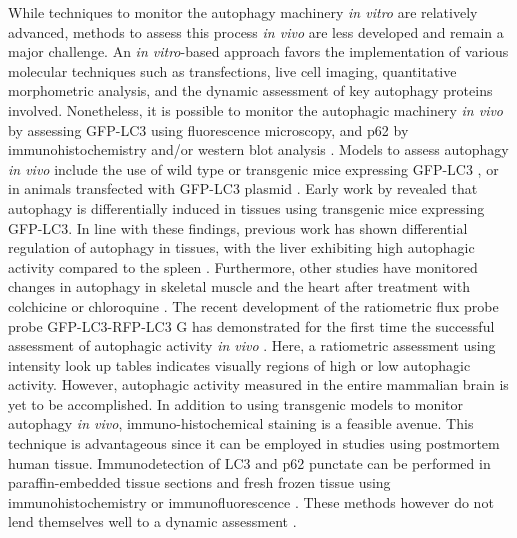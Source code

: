 While techniques to monitor the autophagy machinery \textit{in vitro} are relatively advanced, methods to assess this process \textit{in vivo} are less developed and remain a major challenge. An \textit{in vitro}-based approach favors the implementation of various molecular techniques such as transfections, live cell imaging, quantitative morphometric analysis, and the dynamic assessment of key autophagy proteins involved. Nonetheless, it is possible to monitor the autophagic machinery \textit{in vivo} by assessing GFP-LC3 using fluorescence microscopy, and p62 by immunohistochemistry and/or western blot analysis \citep{klionsky2016}. Models to assess autophagy \textit{in vivo} include the use of wild type or transgenic mice expressing GFP-LC3 \citep{Mizushima2004a,Rodriguez-Muela2012}, or in animals transfected with GFP-LC3 plasmid \citep{Mammucari2007}. Early work by \citet{Mizushima2004a} revealed that autophagy is differentially induced in tissues using transgenic mice expressing GFP-LC3. In line with these findings, previous work has shown differential regulation of autophagy in tissues, with the liver exhibiting high autophagic activity compared to the spleen \citep{Haspel2011}. Furthermore, other studies have monitored changes in autophagy in skeletal muscle and the heart after treatment with colchicine \citep{Ju2010} or chloroquine \citep{Kanamori2015}. The recent development of the ratiometric flux probe probe GFP-LC3-RFP-LC3 G has demonstrated for the first time the successful assessment of autophagic activity \textit{in vivo} \citep{Kaizuka2016}. Here, a ratiometric assessment using intensity look up tables indicates visually regions of high or low autophagic activity. However, autophagic activity measured in the entire mammalian brain is yet to be accomplished. In addition to using transgenic models to monitor autophagy \textit{in vivo}, immuno-histochemical staining is a feasible avenue. This technique is advantageous since it can be employed in studies using postmortem human tissue. Immunodetection of LC3 and p62 punctate can be performed in paraffin-embedded tissue sections and fresh frozen tissue using immunohistochemistry or immunofluorescence \citep{He2016,Holt2011,Martinet2006,Schlafli2015}. These methods however do not lend themselves well to a dynamic assessment \citep{klionsky2016}.

